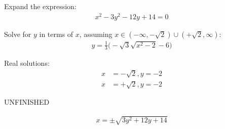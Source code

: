 Expand the expression:
\begin{align*}
x^{2} - 3 y^{2} - 12y + 14 = 0
\end{align*}

Solve for $y$ in terms of $x$, assuming $x\in(-\infty, -\sqrt{2}) \cup (+\sqrt{2}, \infty)$:
\begin{align*}
y = \frac{1}{3} \bigl(- \sqrt{3} \sqrt{x^{2}-2} - 6 \bigr)
\end{align*}

Real solutions:
\begin{align*}
x & = -\sqrt{2}, y=-2
\\
x & = +\sqrt{2}, y=-2
\end{align*}


UNFINISHED


\begin{align*}
x = \pm \sqrt{3y^{2}+12y+14}
\end{align*}
